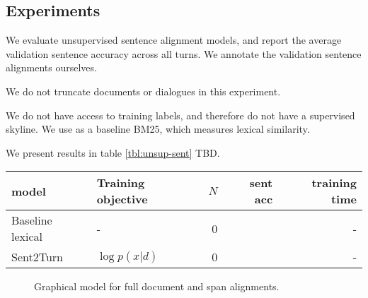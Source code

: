 \documentclass[11pt]{article}
\begin{document}
\subsection{Experiments}
We evaluate unsupervised sentence alignment models,
and report the average validation sentence accuracy across all turns.
We annotate the validation sentence alignments ourselves.

We do not truncate documents or dialogues in this experiment.

We do not have access to training labels, and therefore do not have a supervised skyline.
We use as a baseline BM25, which measures lexical similarity.

We present results in table \ref{tbl:unsup-sent} TBD.

\begin{table*}
\centering
\begin{tabular}{llrrr}
\toprule
model                             & Training objective     & $N$   & sent acc & training time\\
\midrule
Baseline lexical                  & -                      & 0     &    & -\\
Sent2Turn                         & $\log p(x|d)$          & 0     &    & -\\
\bottomrule
\end{tabular}
\caption{
\label{tbl:unsup-sent}
Results for document classification with a generative model at the first
agent action in a conversation. Documents and dialogues are truncated to the first 256
tokens.
The number of labeled training examples is $N$.}
\end{table*}

\begin{figure}[t]
\begin{center}
\end{center}
\caption{Graphical model for full document and span alignments.
}
\label{fig:pgm-doc-sent}
\end{figure}
\end{document}
